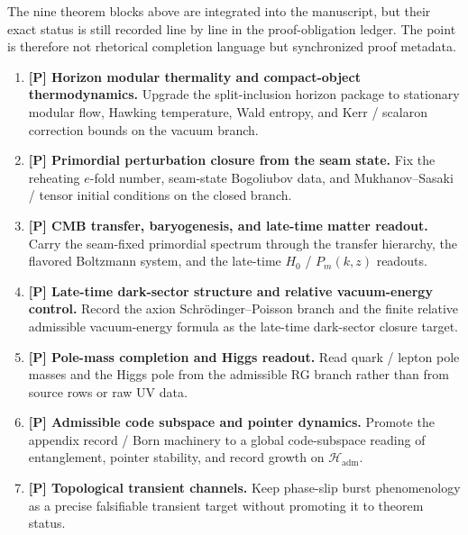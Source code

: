 \begin{remark}
The nine theorem blocks above are integrated into the manuscript, but their exact status is still
recorded line by line in the proof-obligation ledger. The point is therefore not rhetorical
completion language but synchronized proof metadata.
\end{remark}

\begin{tcolorbox}[colback=tfptblue!2, colframe=tfptblue!40, breakable,
    title={Extended downstream closure surface}, colbacktitle=tfptblue!60]
\begin{enumerate}[leftmargin=1.5em, topsep=3pt, itemsep=4pt]
    \item \textbf{[P] Horizon modular thermality and compact-object thermodynamics.} Upgrade the split-inclusion horizon package to stationary modular flow, Hawking temperature, Wald entropy, and Kerr / scalaron correction bounds on the vacuum branch.
    \item \textbf{[P] Primordial perturbation closure from the seam state.} Fix the reheating $e$-fold number, seam-state Bogoliubov data, and Mukhanov--Sasaki / tensor initial conditions on the closed branch.
    \item \textbf{[P] CMB transfer, baryogenesis, and late-time matter readout.} Carry the seam-fixed primordial spectrum through the transfer hierarchy, the flavored Boltzmann system, and the late-time $H_0$ / $P_m(k,z)$ readouts.
    \item \textbf{[P] Late-time dark-sector structure and relative vacuum-energy control.} Record the axion Schr\"odinger--Poisson branch and the finite relative admissible vacuum-energy formula as the late-time dark-sector closure target.
    \item \textbf{[P] Pole-mass completion and Higgs readout.} Read quark / lepton pole masses and the Higgs pole from the admissible RG branch rather than from source rows or raw UV data.
    \item \textbf{[P] Admissible code subspace and pointer dynamics.} Promote the appendix record / Born machinery to a global code-subspace reading of entanglement, pointer stability, and record growth on $\mathcal H_{\mathrm{adm}}$.
    \item \textbf{[P] Topological transient channels.} Keep phase-slip burst phenomenology as a precise falsifiable transient target without promoting it to theorem status.
\end{enumerate}
\end{tcolorbox}

